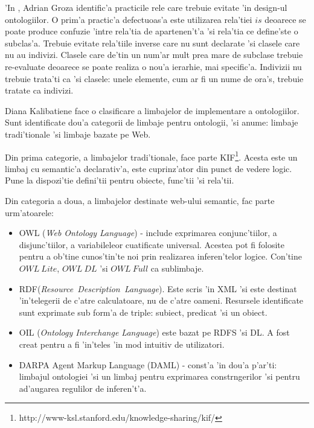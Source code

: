 \documentclass[12pt,a4paper,twoside]{report}
\begin{document}

'In \cite{Press2014AdrianApproach}, Adrian Groza identific'a practicile rele care trebuie evitate 'in design-ul ontologiilor. O prim'a practic'a defectuoas'a este utilizarea rela'tiei $is$ deoarece se poate produce confuzie 'intre rela'tia de apartenen't'a 'si rela'tia ce define'ste o subclas'a. Trebuie evitate rela'tiile inverse care nu sunt declarate 'si clasele care nu au indivizi. Clasele care de'tin un num'ar mult prea mare de subclase trebuie re-evaluate deoarece se poate realiza o nou'a ierarhie, mai specific'a. Indivizii nu trebuie trata'ti ca 'si clasele: unele elemente, cum ar fi un nume de ora's, trebuie tratate ca indivizi.

Diana Kalibatiene \cite{owl_languages} face o clasificare a limbajelor de implementare a ontologiilor. Sunt identificate dou'a categorii de limbaje pentru ontologii, 'si anume: limbaje tradi'tionale 'si limbaje bazate pe Web. 

Din prima categorie, a limbajelor tradi'tionale, face parte KIF\footnote{http://www-ksl.stanford.edu/knowledge-sharing/kif/}. Acesta este un limbaj cu semantic'a declarativ'a, este cuprinz'ator din punct de vedere logic. Pune la dispozi'tie defini'tii pentru obiecte, func'tii 'si rela'tii.

Din categoria a doua, a limbajelor destinate web-ului semantic, fac parte urm'atoarele:

\begin{itemize}
    \item OWL ({\it Web Ontology Language}) - include exprimarea conjunc'tiilor, a disjunc'tiilor, a variabileleor cuatificate universal. Acestea pot fi folosite pentru a ob'tine cunos'tin'te noi prin realizarea inferen'telor logice. Con'tine $OWL\ Lite$, $OWL\ DL$ 'si $OWL\ Full$ ca sublimbaje.
    \item RDF({\it Resource\ Description\ Language}). Este scris 'in XML 'si este destinat 'in'telegerii de c'atre calculatoare, nu de c'atre oameni. Resursele identificate sunt exprimate sub form'a de triple: subiect, predicat 'si un obiect. 
    \item OIL ({\it Ontology Interchange Language}) este bazat pe RDFS 'si DL. A fost creat pentru a fi 'in'teles 'in mod intuitiv de utilizatori. 
    \item DARPA Agent Markup Language (DAML) - const'a 'in dou'a p'ar'ti: limbajul ontologiei  'si un limbaj pentru exprimarea constr\ia ngerilor 'si pentru ad'augarea regulilor de inferen't'a.
\end{itemize}
\end{document}
